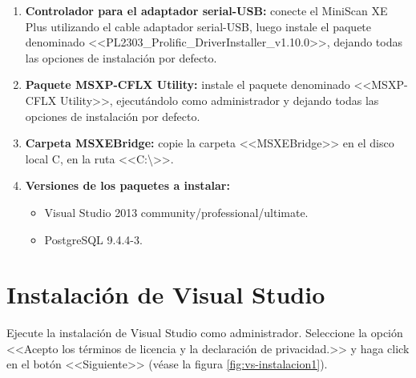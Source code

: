 \begin{enumerate}
	\item \textbf{Controlador para el adaptador serial-USB:} conecte el MiniScan XE Plus utilizando el cable adaptador serial-USB, luego instale el paquete denominado <<PL2303\_Prolific\_DriverInstaller\_v1.10.0>>, dejando todas las opciones de instalaci\'{o}n por defecto.
	
	\item \textbf{Paquete MSXP-CFLX Utility:} instale el paquete denominado <<MSXP-CFLX Utility>>, ejecut\'{a}ndolo como administrador y dejando todas las opciones de instalaci\'{o}n por defecto.
	
	\item \textbf{Carpeta MSXEBridge:} copie la carpeta <<MSXEBridge>> en el disco local C, en la ruta <<C:\textbackslash>>.
	
	\item \textbf{Versiones de los paquetes a instalar:} 
	\begin{itemize}
		\item Visual Studio 2013 community/professional/ultimate.
	
		\item PostgreSQL 9.4.4-3.
	\end{itemize}
\end{enumerate}

\newpage

\section*{Instalaci\'{o}n de Visual Studio}
	
Ejecute la instalaci\'{o}n de Visual Studio como administrador. Seleccione la opci\'{o}n <<Acepto los t\'{e}rminos de licencia y la declaraci\'{o}n de privacidad.>> y haga click en el bot\'{o}n <<Siguiente>> (v\'{e}ase la figura \ref{fig:vs-instalacion1}).

